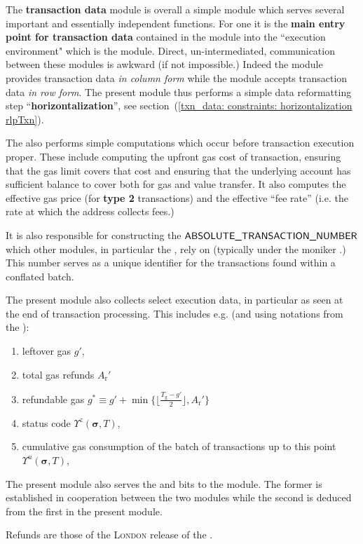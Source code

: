 The \textbf{transaction data} module \txnDataMod{} is overall a simple module which serves several important and essentially independent functions.
For one it is the \textbf{main entry point for transaction data} contained in the \rlpTxnMod{} module into the ``execution environment" which is the \hubMod{} module.
Direct, un-intermediated, communication between these modules is awkward (if not impossible.)
Indeed the \rlpTxnMod{} module provides transaction data \emph{in column form} while the \hubMod{} module accepts transaction data \emph{in row form}.
The present module thus performs a simple data reformatting step ``\textbf{horizontalization}'', see section~(\ref{txn_data: constraints: horizontalization rlpTxn}).

The \txnDataMod{} also performs simple computations which occur before transaction execution proper.
These include computing the upfront gas cost of transaction, ensuring that the gas limit covers that cost and ensuring that the underlying account has sufficient balance to cover both for gas and value transfer.
It also computes the effective gas price (for \textbf{type 2} transactions) and the effective ``fee rate'' (i.e. the rate at which the  address collects fees.)

It is also responsible for constructing the $\textsf{ABSOLUTE\_TRANSACTION\_NUMBER}$ which other modules, in particular the \hubMod{}, rely on (typically under the moniker \absTxNum{}.)
This number serves as a unique identifier for the transactions found within a conflated batch.

The present module also collects select execution data, in particular as seen at the end of transaction processing.
This includes e.g. (and using notations from the \cite{EYP}):
\begin{enumerate}
        \item leftover gas $g'$,
        \item total gas refunds $A_\text{r}'$
        \item refundable gas \( \displaystyle g^* \equiv g' + \min\Big\{\Big\lfloor\frac{T_\text{g} - g'}2\Big\rfloor, A_\text{r}'\Big\} \)
        \item status code $\Upsilon^z(\bm{\sigma}, T)$,
        \item cumulative gas consumption of the batch of transactions up to this point $\Upsilon^u(\bm{\sigma}, T)$,
\end{enumerate}
The present module also serves the \txRequiresEvmExecution{} and \txCopyTxcd{} bits to the \hubMod{} module. 
The former is established in cooperation between the two modules while the second is deduced from the first in the present module.

\saNote{} Refunds are those of the \textsc{London} release of the \evm{}.

